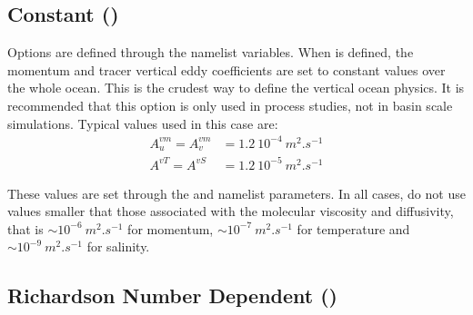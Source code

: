 \documentclass[NEMO_book]{subfiles}
\begin{document}
\subsection{Constant ()}
\label{ZDF_cst}

Options are defined through the   namelist variables.
When  is defined, the momentum and tracer vertical eddy coefficients 
are set to constant values over the whole ocean. This is the crudest way to define 
the vertical ocean physics. It is recommended that this option is only used in 
process studies, not in basin scale simulations. Typical values used in this case are:
\begin{align*} 
A_u^{vm} = A_v^{vm} &= 1.2\ 10^{-4}~m^2.s^{-1} 	\\
A^{vT} = A^{vS} &= 1.2\ 10^{-5}~m^2.s^{-1}
\end{align*}

These values are set through the  and  namelist parameters. 
In all cases, do not use values smaller that those associated with the molecular 
viscosity and diffusivity, that is $\sim10^{-6}~m^2.s^{-1}$ for momentum, 
$\sim10^{-7}~m^2.s^{-1}$ for temperature and $\sim10^{-9}~m^2.s^{-1}$ for salinity.


\subsection{Richardson Number Dependent ()}
\label{ZDF_ric}

\end{document}

